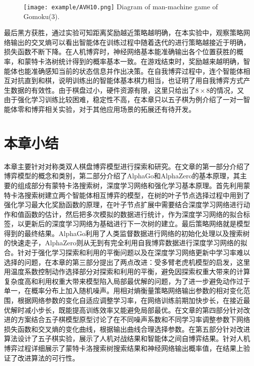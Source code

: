 \begin{figure}[htbp]
	\centering
	\texttt{[image: example/AVH10.png]}
	\hspace{0.5cm}
	{Diagram of man-machine game of Gomoku(3).}
	\label{fig:human6}
\end{figure}


最后黑方获胜，通过实验可知距离奖励越近策略越明确，在本实验中，观察策略网络输出的交叉熵可以看出智能体在训练过程中随着迭代的进行策略越接近于明确，损失函数不断下降。在人机博弈时，神经网络基本能准确输出各个位置获胜的概率，和蒙特卡洛树统计得到的概率基本一致。在游戏结束时，奖励越来越明确，智能体也能准确感知当前的状态信息并作出决策。在自我博弈过程中，连个智能体相互对抗直到和棋，说明训练出的智能体基本棋力相当，也证明了用自我博弈方式产生数据的有效性。由于棋盘过小，硬件资源有限，这里只给出了$8 \times 8$的情况，又由于强化学习训练比较困难，稳定性不高，在本章只以五子棋为例介绍了一对一智能体零和博弈相关实验，对于其他应用场景的拓展还有待开发。

\section{本章小结}

本章主要针对对称类双人棋盘博弈模型进行探索和研究。在文章的第一部分介绍了博弈模型的概念和类别，第二部分介绍了AlphaGo和AlphaZero的基本原理，其主要的组成部分有蒙特卡洛搜索树，深度学习网络和强化学习基本原理。首先利用蒙特卡洛搜索树建立两个智能体相互博弈的模型，在树的叶子节点选择过程中用到了强化学习最大化奖励函数的原理，在叶子节点扩展中需要结合深度学习网络进行动作和值函数的估计，然后把多次模拟的数据进行统计，作为深度学习网络的拟合标签，以更新后的深度学习网络为基础进行下一次树的建立。最后策略网络就是模型得到的最终结果。AlphaGo利用了人类监督数据进行网络的初始化处理以及搜索树的快速走子，AlphaZero则从无到有完全利用自我博弈数据进行深度学习网络的拟合。针对于强化学习探索和利用的平衡问题以及在深度学习网络更新中学习率难以选择的问题，在本章的第三部分提出了两点改进：受多臂老虎机模型的启发，这里用温度系数控制动作选择部分对探索和利用的平衡，避免因探索权重大带来的计算复杂度高和利用权重大带来模型陷入局部最优解的问题，为了进一步避免动作过于单一，在概率分布上加入随机噪声。用相对熵衡量策略网络输出参数的相对变化范围，根据网络参数的变化自适应调整学习率，在网络训练前期加快步长，在接近最优解时减小步长，既能提高训练效率又能避免局部最优。在文章的第四部分针对改进的方案结合五子棋模型原型讨论了在不同噪声系数和不同学习率调整参数下网络损失函数和交叉熵的变化曲线，根据输出曲线合理选择参数。在第五部分针对改进算法设计了五子棋实验，展示了人机对战结果和智能体之间自博弈结果。针对人机博弈过程详细展示了蒙特卡洛搜索树搜索结果和神经网络输出概率值，在结果上验证了改进算法的可行性。